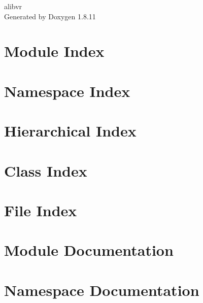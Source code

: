 \documentclass[twoside]{book}
\newcommand{\+}{\discretionary{\mbox{\scriptsize$\hookleftarrow$}}{}{}}
\newcommand{\clearemptydoublepage}{%
  \newpage{\pagestyle{empty}\cleardoublepage}%
}
\begin{document}
\hypersetup{pageanchor=false,
             bookmarksnumbered=true,
             pdfencoding=unicode
            }
\begin{titlepage}
\vspace*{7cm}
\begin{center}%
{\Large alibvr }\\
\vspace*{1cm}
{\large Generated by Doxygen 1.8.11}\\
\end{center}
\end{titlepage}
\clearemptydoublepage
\tableofcontents
\clearemptydoublepage
{}
\hypersetup{pageanchor=true}

\chapter{Module Index}

\chapter{Namespace Index}

\chapter{Hierarchical Index}

\chapter{Class Index}

\chapter{File Index}

\chapter{Module Documentation}

\chapter{Namespace Documentation}




\end{document}
